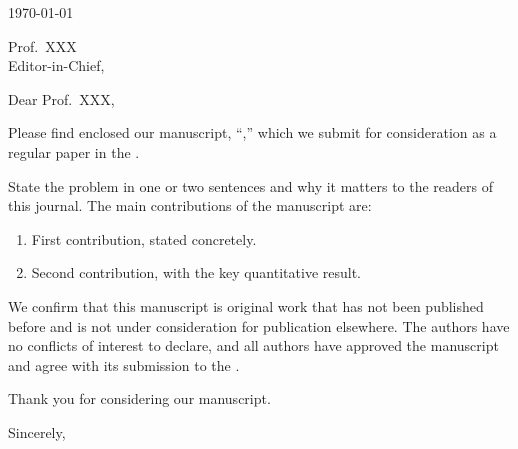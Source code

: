 \documentclass[11pt]{article}
\begin{document}
\today

Prof.\ XXX\\
Editor-in-Chief, \PaperVenue

Dear Prof.\ XXX,

Please find enclosed our manuscript, ``\PaperTitle,'' which we submit for consideration as a regular paper in the \PaperVenue.

State the problem in one or two sentences and why it matters to the readers of this journal. The main contributions of the manuscript are:
\begin{enumerate}
  \item First contribution, stated concretely.
  \item Second contribution, with the key quantitative result.
\end{enumerate}

We confirm that this manuscript is original work that has not been published before and is not under consideration for publication elsewhere. The authors have no conflicts of interest to declare, and all authors have approved the manuscript and agree with its submission to the \PaperVenue.

Thank you for considering our manuscript.

Sincerely,

\end{document}
